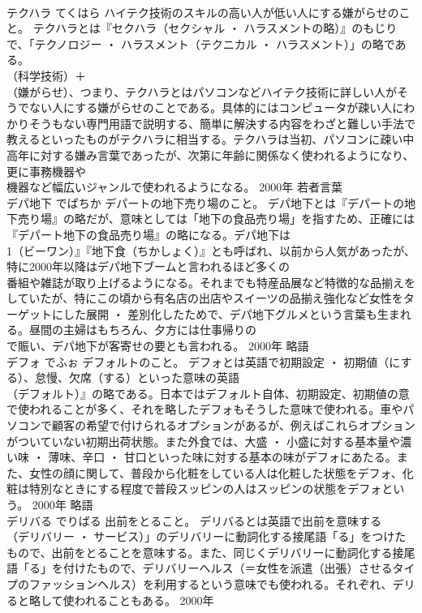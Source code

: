 \documentclass[8pt]{extreport}
\begin{document}
\begin{CJK}{UTF8}{min}
\\	テクハラ	てくはら	ハイテク技術のスキルの高い人が低い人にする嫌がらせのこと。	テクハラとは『セクハラ（セクシャル ・ ハラスメントの略）』のもじりで、「テクノロジー ・ ハラスメント（テクニカル ・ ハラスメント）」の略である。
\\	（科学技術）＋
\\	（嫌がらせ）、つまり、テクハラとはパソコンなどハイテク技術に詳しい人がそうでない人にする嫌がらせのことである。具体的にはコンピュータが疎い人にわかりそうもない専門用語で説明する、簡単に解決する内容をわざと難しい手法で教えるといったものがテクハラに相当する。テクハラは当初、パソコンに疎い中高年に対する嫌み言葉であったが、次第に年齢に関係なく使われるようになり、更に事務機器や
\\	機器など幅広いジャンルで使われるようになる。	2000年	若者言葉	
\\	デパ地下	でぱちか	デパートの地下売り場のこと。	デパ地下とは『デパートの地下売り場』の略だが、意味としては「地下の食品売り場」を指すため、正確には『デパート地下の食品売り場』の略になる。デパ地下は
\\	1（ビーワン）』『地下食（ちかしょく）』とも呼ばれ、以前から人気があったが、特に2000年以降はデパ地下ブームと言われるほど多くの
\\	番組や雑誌が取り上げるようになる。それまでも特産品展など特徴的な品揃えをしていたが、特にこの頃から有名店の出店やスイーツの品揃え強化など女性をターゲットにした展開 ・ 差別化したためで、デパ地下グルメという言葉も生まれる。昼間の主婦はもちろん、夕方には仕事帰りの
\\	で賑い、デパ地下が客寄せの要とも言われる。	2000年	略語	
\\	デフォ	でふぉ	デフォルトのこと。	デフォとは英語で初期設定 ・ 初期値（にする）、怠慢、欠席（する）といった意味の英語
\\	（デフォルト）』の略である。日本ではデフォルト自体、初期設定、初期値の意で使われることが多く、それを略したデフォもそうした意味で使われる。車やパソコンで顧客の希望で付けられるオプションがあるが、例えばこれらオプションがついていない初期出荷状態。また外食では、大盛 ・ 小盛に対する基本量や濃い味 ・ 薄味、辛口 ・ 甘口といった味に対する基本の味がデフォにあたる。また、女性の顔に関して、普段から化粧をしている人は化粧した状態をデフォ、化粧は特別なときにする程度で普段スッピンの人はスッピンの状態をデフォという。	2000年	略語	
\\	デリバる	でりばる	出前をとること。	デリバるとは英語で出前を意味する
\\	（デリバリー ・ サービス）」のデリバリーに動詞化する接尾語「る」をつけたもので、出前をとることを意味する。また、同じくデリバリーに動詞化する接尾語「る」を付けたもので、デリバリーヘルス（＝女性を派遣（出張）させるタイプのファッションヘルス）を利用するという意味でも使われる。それぞれ、デリると略して使われることもある。	2000年	

\end{CJK}
\end{document}
